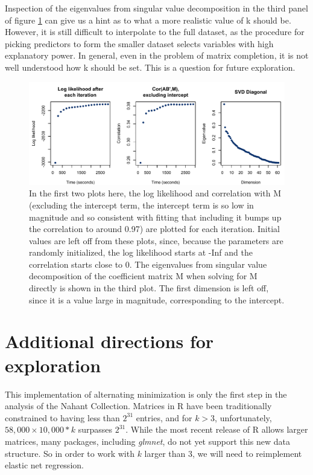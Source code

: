\documentclass[12pt,twoside]{mitthesis-manusdown}
\begin{document}
Inspection of the eigenvalues from singular value decomposition in the
third panel of figure \ref{fig:figllcorsvd} can give us a hint as to
what a more realistic value of k should be. However, it is still
difficult to interpolate to the full dataset, as the procedure for
picking predictors to form the smaller dataset selects variables with
high explanatory power. In general, even in the problem of matrix
completion, it is not well understood how k should be set. This is a
question for future exploration.
\begin{figure}[tb!]

{\centering \includegraphics[width=1\linewidth]{figurespred/figllcorsvd} 

}

\caption{\label{fig:figllcorsvd}In the first two plots here, the log likelihood and correlation with M (excluding the intercept term, the intercept term is so low in magnitude and so consistent with fitting that including it bumps up the correlation to around 0.97) are plotted for each iteration. Initial values are left off from these plots, since, because the parameters are randomly initialized, the log likelihood starts at -Inf and the correlation starts close to 0. The eigenvalues from singular value decomposition of the coefficient matrix M when solving for M directly is shown in the third plot. The first dimension is left off, since it is a value large in magnitude, corresponding to the intercept.}\label{fig:figllcorsvd}
\end{figure}
\section{Additional directions for
exploration}\label{additional-directions-for-exploration}

This implementation of alternating minimization is only the first step
in the analysis of the Nahant Collection. Matrices in R have been
traditionally constrained to having less than \(2^{31}\) entries, and
for \(k>3\), unfortunately, \(58,000 \times 10,000 * k\) surpasses
\(2^31\). While the most recent release of R allows larger matrices,
many packages, including \emph{glmnet}, do not yet support this new data
structure. So in order to work with \(k\) larger than 3, we will need to
reimplement elastic net regression.
\end{document}
